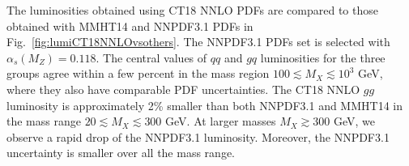 The luminosities obtained using CT18 NNLO PDFs are compared to those obtained with MMHT14 and NNPDF3.1 PDFs in Fig.~\ref{fig:lumiCT18NNLOvsothers}. 
The NNPDF3.1 PDFs set is selected with $\alpha_s(M_Z) = 0.118$. 
The  central values  of $qq$ and $gq$ luminosities for the three
groups agree within a few percent in the mass region $100\lesssim
M_{X}\lesssim 10^{3}$ GeV, where they also have comparable PDF
uncertainties. The CT18 NNLO $gg$ luminosity is approximately 2\%
smaller than both NNPDF3.1 and MMHT14 in the mass range
$20\lesssim M_{X}\lesssim 300$ GeV.
At larger masses $M_X \gtrsim 300$ GeV, we observe a rapid drop of the
NNPDF3.1 luminosity. Moreover, the NNPDF3.1 uncertainty is smaller
over all the mass range.      

 

\begin{widetext}


\end{widetext}

